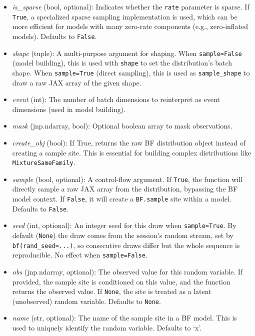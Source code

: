 \documentclass[
  letterpaper,
  DIV=11,
  numbers=noendperiod]{scrartcl}
\begin{document}
\begin{itemize}
\item
  \emph{is\_sparse} (bool, optional): Indicates whether the
  \texttt{rate} parameter is sparse. If \texttt{True}, a specialized
  sparse sampling implementation is used, which can be more efficient
  for models with many zero-rate components (e.g., zero-inflated
  models). Defaults to \texttt{False}.
\item
  \emph{shape} (tuple): A multi-purpose argument for shaping. When
  \texttt{sample=False} (model building), this is used with
  \texttt{shape} to set the distribution's batch shape. When
  \texttt{sample=True} (direct sampling), this is used as
  \texttt{sample\_shape} to draw a raw JAX array of the given shape.
\item
  \emph{event} (int): The number of batch dimensions to reinterpret as
  event dimensions (used in model building).
\item
  \emph{mask} (jnp.ndarray, bool): Optional boolean array to mask
  observations.
\item
  \emph{create\_obj} (bool): If True, returns the raw BF distribution
  object instead of creating a sample site. This is essential for
  building complex distributions like \texttt{MixtureSameFamily}.
\item
  \emph{sample} (bool, optional): A control-flow argument. If
  \texttt{True}, the function will directly sample a raw JAX array from
  the distribution, bypassing the BF model context. If \texttt{False},
  it will create a \texttt{BF.sample} site within a model. Defaults to
  \texttt{False}.
\item
  \emph{seed} (int, optional): An integer seed for this draw when
  \texttt{sample=True}. By default (\texttt{None}) the draw comes from
  the session's random stream, set by \texttt{bf(rand\_seed=...)}, so
  consecutive draws differ but the whole sequence is reproducible. No
  effect when \texttt{sample=False}.
\item
  \emph{obs} (jnp.ndarray, optional): The observed value for this random
  variable. If provided, the sample site is conditioned on this value,
  and the function returns the observed value. If \texttt{None}, the
  site is treated as a latent (unobserved) random variable. Defaults to
  \texttt{None}.
\item
  \emph{name} (str, optional): The name of the sample site in a BF
  model. This is used to uniquely identify the random variable. Defaults
  to `x'.
\end{itemize}
\end{document}
